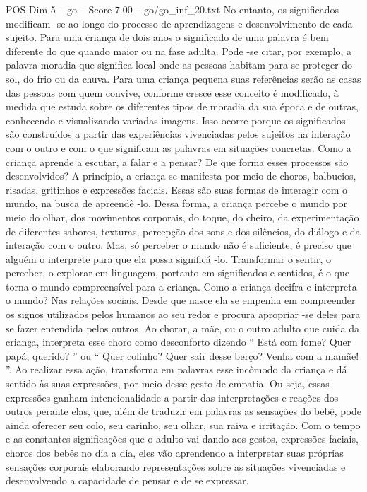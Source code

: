 \begin{textsample}{POS Dim 5 – go – Score 7.00 – go/go\_inf\_20.txt}
No entanto, os significados modificam -se ao longo do processo de aprendizagens e desenvolvimento de cada sujeito.
Para uma criança de dois anos o significado de uma palavra é bem diferente do que quando maior ou na fase adulta.
Pode -se citar, por exemplo, a palavra moradia que significa local onde as pessoas habitam para se proteger do sol, do frio ou da chuva.
Para uma criança pequena suas referências serão as casas das pessoas com quem convive, conforme cresce esse conceito é modificado, à medida que estuda sobre os diferentes tipos de moradia da sua época e de outras, conhecendo e visualizando variadas imagens.
Isso ocorre porque os significados são construídos a partir das experiências vivenciadas pelos sujeitos na interação com o outro e com o que significam as palavras em situações concretas.
Como a criança aprende a escutar, a falar e a pensar?
De que forma esses processos são desenvolvidos?
A princípio, a criança se manifesta por meio de choros, balbucios, risadas, gritinhos e expressões faciais.
Essas são suas formas de interagir com o mundo, na busca de apreendê -lo.
Dessa forma, a criança percebe o mundo por meio do olhar, dos movimentos corporais, do toque, do cheiro, da experimentação de diferentes sabores, texturas, percepção dos sons e dos silêncios, do diálogo e da interação com o outro.
Mas, só perceber o mundo não é suficiente, é preciso que alguém o interprete para que ela possa significá -lo.
Transformar o sentir, o perceber, o explorar em linguagem, portanto em significados e sentidos, é o que torna o mundo compreensível para a criança.
Como a criança decifra e interpreta o mundo?
Nas relações sociais.
Desde que nasce ela se empenha em compreender os signos utilizados pelos humanos ao seu redor e procura apropriar -se deles para se fazer entendida pelos outros.
Ao chorar, a mãe, ou o outro adulto que cuida da criança, interpreta esse choro como desconforto dizendo “ Está com fome?
Quer papá, querido? ” ou “ Quer colinho?
Quer sair desse berço?
Venha com a mamãe! ”.
Ao realizar essa ação, transforma em palavras esse incômodo da criança e dá sentido às suas expressões, por meio desse gesto de empatia.
Ou seja, essas expressões ganham intencionalidade a partir das interpretações e reações dos outros perante elas, que, além de traduzir em palavras as sensações do bebê, pode ainda oferecer seu colo, seu carinho, seu olhar, sua raiva e irritação.
Com o tempo e as constantes significações que o adulto vai dando aos gestos, expressões faciais, choros dos bebês no dia a dia, eles vão aprendendo a interpretar suas próprias sensações corporais elaborando representações sobre as situações vivenciadas e desenvolvendo a capacidade de pensar e de se expressar.

\end{textsample}
